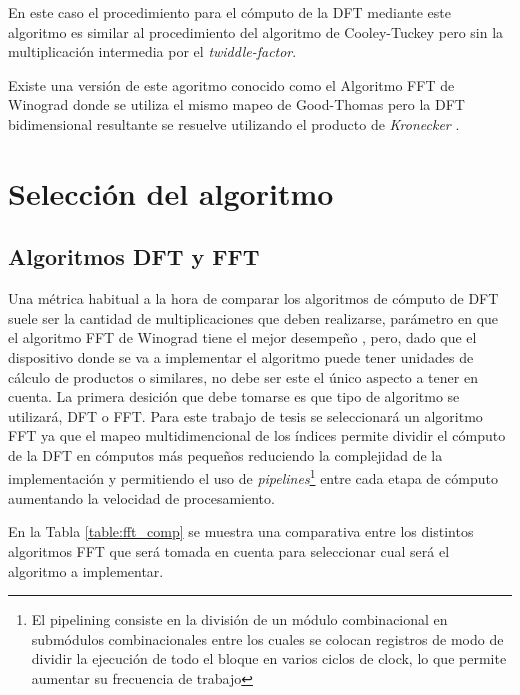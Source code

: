 En este caso el procedimiento para el cómputo de la DFT mediante este algoritmo es similar al
procedimiento del algoritmo de Cooley-Tuckey pero sin la multiplicación intermedia por el
\textit{twiddle-factor}.

Existe una versión de este agoritmo conocido como el Algoritmo FFT de Winograd donde se
utiliza el mismo mapeo de Good-Thomas pero la DFT bidimensional resultante se resuelve utilizando el producto
de \textit{Kronecker} \cite{Meyer_Kron}.

\section{Selección del algoritmo}

\subsection{Algoritmos DFT y FFT} \label{sec:dftOfft}

Una métrica habitual a la hora de comparar los algoritmos de cómputo de DFT suele ser la cantidad de
multiplicaciones que deben realizarse, parámetro en que el algoritmo FFT de Winograd tiene el mejor
desempeño \cite{Meyer_Kron}, pero, dado que el dispositivo donde se va a implementar el algoritmo
puede tener unidades de cálculo de productos o similares, no debe ser este el único aspecto a tener
en cuenta.
La primera desición que debe tomarse es que tipo de algoritmo se utilizará, DFT o FFT. Para este
trabajo de tesis se seleccionará un algoritmo FFT ya que el mapeo multidimencional de los índices
permite dividir el cómputo de la DFT en cómputos más pequeños reduciendo la complejidad de la
implementación y permitiendo el uso de \textit{pipelines}\footnote{\label{pipeline} El pipelining
consiste en la división de un módulo combinacional en submódulos combinacionales entre los cuales
se colocan registros de modo de dividir la ejecución de todo el bloque en varios ciclos de clock,
lo que permite aumentar su frecuencia de trabajo} entre cada etapa de cómputo aumentando la
velocidad de procesamiento.

En la Tabla \ref{table:fft_comp}  se muestra una comparativa entre los distintos algoritmos FFT que
será tomada en cuenta para seleccionar cual será el algoritmo a implementar.

